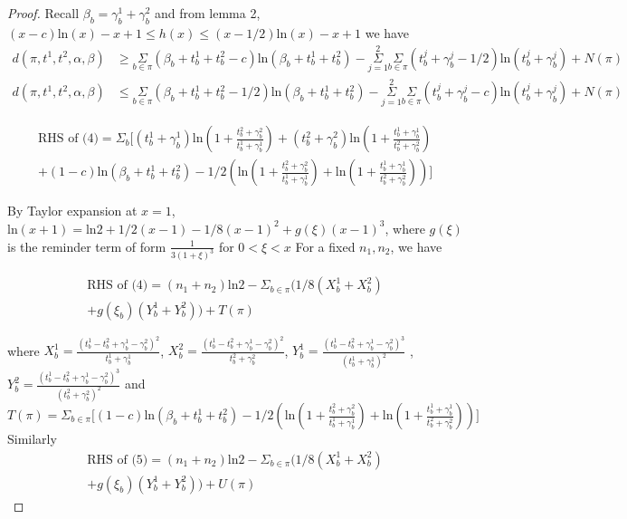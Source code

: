 \documentclass[aoas,preprint]{imsart}
\begin{document}
\begin{proof}
Recall $\beta_b = \gamma_b^1 + \gamma_b^2$ and from lemma 2, $(x - c)\text{ln}(x) - x + 1 \leq h(x) \leq (x - 1/2)\text{ln}(x) - x + 1$ we have 
\begin{align}
d(\pi, t^1, t^2, \alpha, \beta) &\geq \underset{b\in \pi}\Sigma (\beta_b + t_b^1 + t_b^2 - c) \text{ln}(\beta_b  + t_b^1 + t_b^2) - \overset{2}{\underset{j = 1}{\Sigma}}\underset{b\in\pi}\Sigma (t_b^j + \gamma_b^j - 1/2) \text{ln}(t_b^j + \gamma_b^j) + N(\pi)\\
d(\pi, t^1, t^2, \alpha, \beta) &\leq \underset{b\in \pi}\Sigma (\beta_b + t_b^1 + t_b^2 - 1 / 2) \text{ln}(\beta_b  + t_b^1 + t_b^2) - \overset{2}{\underset{j = 1}{\Sigma}}\underset{b\in\pi}\Sigma (t_b^j + \gamma_b^j - c) \text{ln}(t_b^j + \gamma_b^j) + N(\pi)
\end{align}


\begin{eqnarray*}
\text{RHS of (4)} = \Sigma_b \big[ (t_b^1 + \gamma_b^1) \text{ln}(1 + \frac{t_b^2 + \gamma_b^2}{t_b^1 + \gamma_b^1})
 + (t_b^2 + \gamma_b^2) \text{ln}(1 + \frac{t_b^1 + \gamma_b^1}{t_b^2 + \gamma_b^2})\\
 + (1 - c) \text{ln}(\beta_b + t_b^1 + t_b^2) 
  - 1/2(\text{ln}(1 + \frac{t_b^2 + \gamma_b^2}{t_b^1 + \gamma_b^1}) + \text{ln}(1 + \frac{t_b^1 + \gamma_b^1}{t_b^2 + \gamma_b^2}))\big]
\end{eqnarray*}

By Taylor expansion at $x= 1$, $\text{ln}(x + 1) = \text{ln}2 + 1/2(x - 1) - 1/8(x - 1)^2 + g(\xi) (x - 1)^3$, where $g(\xi)$ is the reminder term of form $\frac{1}{3(1+\xi)^3}$ for $ 0 < \xi < x$
For a fixed $n_1, n_2$, we have 

\begin{eqnarray*}
\text{RHS of (4)} = (n_1 + n_2) \text{ln}2  - \Sigma_{b\in\pi}(1/8 (X_b^1 + X_b^2)\\
+ g(\xi_b) (Y_b^1 + Y_b^2) )+ T(\pi)
\end{eqnarray*}

where $X_b^1 = \frac{(t_b^1 - t_b^2 + \gamma_b^1 - \gamma_b^2)^2}{t_b^1 + \gamma_b^1}$, $X_b^2 =  \frac{(t_b^1 - t_b^2 + \gamma_b^1 - \gamma_b^2)^2}{t_b^2 + \gamma_b^2}$,
$Y_b^1 = \frac{(t_b^1 - t_b^2 + \gamma_b^1 - \gamma_b^2)^3}{(t_b^1 + \gamma_b^1)^2} $ , $Y_b^2 =  \frac{(t_b^1 - t_b^2 + \gamma_b^1 - \gamma_b^2)^3}{(t_b^2 + \gamma_b^2)^2}$
and $T(\pi) = \Sigma_{b\in\pi}\big[(1 - c) \text{ln}(\beta_b + t_b^1 + t_b^2) 
  - 1/2(\text{ln}(1 + \frac{t_b^2 + \gamma_b^2}{t_b^1 + \gamma_b^1}) + \text{ln}(1 + \frac{t_b^1 + \gamma_b^1}{t_b^2 + \gamma_b^2}))\big]$\\
Similarly
\begin{eqnarray*}
\text{RHS of (5)} = (n_1 + n_2) \text{ln}2  -\Sigma_{b\in\pi}(1/8 (X_b^1 + X_b^2)\\
+ g(\xi_b) (Y_b^1 + Y_b^2)) + U(\pi)
\end{eqnarray*}
  

\end{proof}
\end{document}
